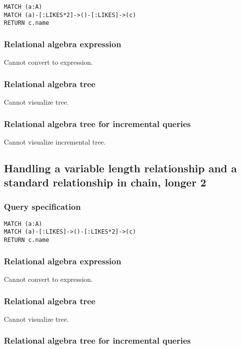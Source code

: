 \begin{lstlisting}
MATCH (a:A)
MATCH (a)-[:LIKES*2]->()-[:LIKES]->(c)
RETURN c.name
\end{lstlisting}

\subsubsection*{Relational algebra expression}

Cannot convert to expression.

\subsubsection*{Relational algebra tree}

Cannot visualize tree.

\subsubsection*{Relational algebra tree for incremental queries}

Cannot visualize incremental tree.

\subsection{Handling a variable length relationship and a standard relationship in chain, longer 2}

\subsubsection*{Query specification}

\begin{lstlisting}
MATCH (a:A)
MATCH (a)-[:LIKES]->()-[:LIKES*2]->(c)
RETURN c.name
\end{lstlisting}

\subsubsection*{Relational algebra expression}

Cannot convert to expression.

\subsubsection*{Relational algebra tree}

Cannot visualize tree.

\subsubsection*{Relational algebra tree for incremental queries}


